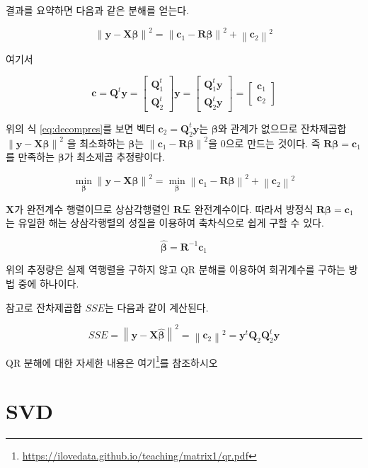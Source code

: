 \documentclass[
]{book}
\makeatletter
\newcommand{\norm}[1]{\left\lVert#1\right\rVert}
\renewcommand{\href}[2]{#2\footnote{\url{#1}}}
\newenvironment{kframe}{%
\medskip{}
\setlength{\fboxsep}{.8em}
 \def\at@end@of@kframe{}%
 \ifinner\ifhmode%
  \def\at@end@of@kframe{\end{minipage}}%
  \begin{minipage}{\columnwidth}%
 \fi\fi%
 \def\FrameCommand##1{\hskip\@totalleftmargin \hskip-\fboxsep
 \colorbox{shadecolor}{##1}\hskip-\fboxsep
     \hskip-\linewidth \hskip-\@totalleftmargin \hskip\columnwidth}%
 \MakeFramed {\advance\hsize-\width
   \@totalleftmargin\z@ \linewidth\hsize
   \@setminipage}}%
 {\par\unskip\endMakeFramed%
 \at@end@of@kframe}
\newenvironment{rmdblock}[1]
  {
  \begin{itemize}
  \renewcommand{\labelitemi}{
    \raisebox{-.7\height}[0pt][0pt]{
      {\setkeys{Gin}{width=3em,keepaspectratio}\texttt{[image: images/\#1]}}
    }
  }
  \setlength{\fboxsep}{1em}
  \begin{kframe}
  \item
  }
  {
  \end{kframe}
  \end{itemize}
  }
\newenvironment{rmdnote}
  {\begin{rmdblock}{note}}
  {\end{rmdblock}}
\theoremstyle{definition}
\theoremstyle{definition}
\theoremstyle{definition}
\theoremstyle{remark}
\makeatother
\begin{document}
결과를 요약하면 다음과 같은 분해를 얻는다.

\begin{equation}
\norm{ \bm y-\bm X \bm \beta}^2 = \norm{ \bm c_1 - \bm R \bm \beta }^2 + \norm{\bm c_2}^2 
\label{eq:decompres}
\end{equation}

여기서

\[
\bm c= \bm Q^t \bm y=
 \begin{bmatrix} 
   \bm Q_1^t \\ 
   \bm Q_2^t 
   \end{bmatrix} \bm y 
   =
   \begin{bmatrix} 
   \bm Q_1^t \bm y  \\ 
   \bm Q_2^t \bm y 
   \end{bmatrix}
   = \begin{bmatrix} 
   \bm c_1 \\ 
   \bm c_2 
\end{bmatrix}  
\]

위의 식 \eqref{eq:decompres}를 보면 벡터 \(\bm c_2= \bm Q_2^t \bm y\)는 \(\bm \beta\)와 관계가 없으므로 잔차제곱합 \(\norm{ \bm y-\bm X \bm \beta}^2\) 을 최소화하는
\(\bm \beta\)는 \(\norm{ \bm c_1 - \bm R \bm \beta }^2\)을 0으로 만드는 것이다. 즉 \(\bm R \bm \beta =\bm c_1\)를 만족하는 \(\bm \beta\)가 최소제곱 추정량이다.

\[
\min_{\bm \beta} \norm{ \bm y-\bm X \bm \beta}^2 = \min_{\bm \beta} \norm{ \bm c_1 - \bm R \bm \beta }^2 +  \norm{\bm c_2}^2 
\]

\(\bm X\)가 완전계수 행렬이므로 상삼각행렬인 \(\bm R\)도 완전계수이다. 따라서 방정식 \(\bm R \bm \beta = \bm c_1\)는 유일한 해는 상삼각행렬의 성질을 이용하여 축차식으로 쉽게 구할 수 있다.

\[ \hat {\bm \beta} =\bm R^{-1} \bm c_1 \]

위의 추정량은 실제 역행렬을 구하지 않고 QR 분해를 이용하여 회귀계수를 구하는 방법 중에 하나이다.

참고로 잔차제곱합 \(SSE\)는 다음과 같이 계산된다.

\[ SSE = \norm{ \bm y-\bm X \hat {\bm \beta}}^2 = \norm{\bm c_2}^2 = \bm y^t \bm Q_2 \bm Q_2^t \bm y \]

\begin{rmdnote}
QR 분해에 대한 자세한 내용은 \href{https://ilovedata.github.io/teaching/matrix1/qr.pdf}{여기}를 참조하시오
\end{rmdnote}

\hypertarget{svd}{%
\section{SVD}\label{svd}}
\end{document}
